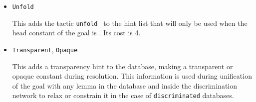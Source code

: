 \begin{coq_example*}
\begin{itemize}


\item \texttt{Unfold} {\qualid}

  This adds the tactic {\tt unfold {\qualid}} to the hint list that
  will only be used when the head constant of the goal is \ident.  Its
  cost is 4.


\item \texttt{Transparent}, \texttt{Opaque} {\qualid}
\label{HintTransparency}

  This adds a transparency hint to the database, making {\tt {\qualid}}
  a transparent or opaque constant during resolution. This information
  is used during unification of the goal with any lemma in the database
  and inside the discrimination network to relax or constrain it in the
  case of \texttt{discriminated} databases.

\end{itemize}
\end{coq_example*}
